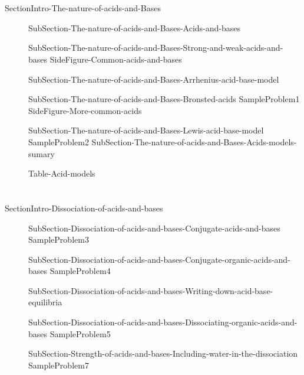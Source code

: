 \documentclass[main.tex]{subfiles}
\begin{document}
\section{\color{blue!30!black}{The nature of acids and Bases}}{SectionIntro-The-nature-of-acids-and-Bases}
\sloppy
\begin{description}
  \item[]  {SubSection-The-nature-of-acids-and-Bases-Acids-and-bases}
   \item[] {SubSection-The-nature-of-acids-and-Bases-Strong-and-weak-acids-and-bases} 
           {SideFigure-Common-acids-and-bases}
  \item[] {SubSection-The-nature-of-acids-and-Bases-Arrhenius-acid-base-model}
\item[]{SubSection-The-nature-of-acids-and-Bases-Bronsted-acids}
  {SampleProblem1}
 {SideFigure-More-common-acids}
\item[]{SubSection-The-nature-of-acids-and-Bases-Lewis-acid-base-model}
   {SampleProblem2}
{SubSection-The-nature-of-acids-and-Bases-Acids-models-sumary} 
 \begin{center} {Table-Acid-models}\end{center}
\end{description}

\section{\color{blue!30!black}{Dissociation of acids and bases}}{SectionIntro-Dissociation-of-acids-and-bases}
\sloppy\begin{description}
\item[] {SubSection-Dissociation-of-acids-and-bases-Conjugate-acids-and-bases}
{SampleProblem3}
\item[] {SubSection-Dissociation-of-acids-and-bases-Conjugate-organic-acids-and-bases}
{SampleProblem4}
\item[] {SubSection-Dissociation-of-acids-and-bases-Writing-down-acid-base-equilibria}
\item[] {SubSection-Dissociation-of-acids-and-bases-Dissociating-organic-acids-and-bases}
{SampleProblem5}
\item[] {SubSection-Strength-of-acids-and-bases-Including-water-in-the-dissociation}
{SampleProblem7}
\end{description}
\end{document}
